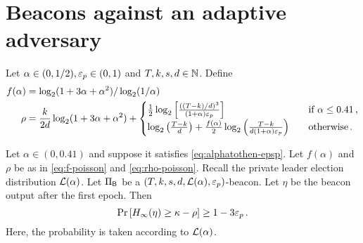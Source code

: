 




\section{Beacons against an adaptive adversary}

Let $\alpha \in (0, 1/2), \mathsf{\varepsilon}_p \in (0, 1)$ and $T, k, s, d \in \mathbb{N}$.
Define 
\begin{align}
    f(\alpha) &= \log_2(1 + 3 \alpha + \alpha^2)/\log_2(1/\alpha) \label{eq:f-poisson} \\
  \rho &= \frac{k}{2 d} \log_2(1+3\alpha+\alpha^2) + \begin{cases}
     \frac{1}{2} \log_2 \left[ \frac{((T-k)/d)^3}{(1+\alpha) \mathsf{\varepsilon}_p } \right] 
      & \quad\text{if $\alpha \leq 0.41$}\,, \\
    \log_2 \left(\frac{T-k}{d} \right)
      + \frac{f(\alpha)}{2} \log_2 \left(\frac{T-k}{d (1+\alpha) \mathsf{\varepsilon}_p} \right) 
      &\quad\text{otherwise\,.}\label{eq:rho-poisson}
  \end{cases}
\end{align}


\begin{theorem}\label{thm:beacon-poisson-single-epoch}
  Let $\alpha \in (0, 0.41)$ and suppose it satisfies \eqref{eq:alphatothen-epsp}.
  Let $f(\alpha)$ and $\rho$ be as in \eqref{eq:f-poisson} and \eqref{eq:rho-poisson}.
  Recall the private leader election distribution $\mathcal{L}(\alpha)$.
  Let $\Pi_{\mathsf{B}}$ be a $(T,k,s,d,\mathcal{L}(\alpha), \mathsf{\varepsilon}_p)$-beacon.
  Let $\eta$ be the beacon output after the first epoch. 
  Then 
  \begin{equation}\label{eq:security-bernoulli-single-epoch}
    \Pr\left[H_\infty(\eta) \geq \kappa - \rho \right] \geq 1 - 3 \mathsf{\varepsilon}_p
    \,.
  \end{equation}
  Here, the probability is taken according to $\mathcal{L}(\alpha)$.
\end{theorem}



